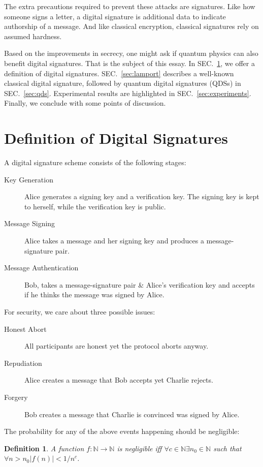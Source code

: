 \documentclass[%
 reprint,
 amsmath,amssymb,
 aps,
 pra,
]{revtex4-1}
\newtheorem{definition}{Definition}[section]
\begin{document}
The extra precautions required to prevent these attacks are signatures. Like how someone signs a letter, a digital signature is additional data to indicate authorship of a message. And like classical encryption, classical signatures rely on assumed hardness.

Based on the improvements in secrecy, one might ask if quantum physics can also benefit digital signatures. That is the subject of this essay. In SEC.\ \ref{sec:def}, we offer a definition of digital signatures. SEC.\ \ref{sec:lamport} describes a well-known classical digital signature, followed by quantum digital signatures (QDSs) in SEC.\ \ref{sec:qds}. Experimental results are highlighted in SEC.\ \ref{sec:experiments}. Finally, we conclude with some points of discussion.

\section{Definition of Digital Signatures}
\label{sec:def}

A digital signature scheme consists of the following stages:

\begin{description}
\item[Key Generation]Alice generates a signing key and a verification key. The signing key is kept to herself, while the verification key is public.
\item[Message Signing]Alice takes a message and her signing key and produces a message-signature pair.
\item[Message Authentication]Bob, takes a message-signature pair \& Alice's verification key and accepts if he thinks the message was signed by Alice.
\end{description}

For security, we care about three possible issues:

\begin{description}
\item[Honest Abort]All participants are honest yet the protocol aborts anyway.
\item[Repudiation]Alice creates a message that Bob accepts yet Charlie rejects.
\item[Forgery]Bob creates a message that Charlie is convinced was signed by Alice.
\end{description}

The probability for any of the above events happening should be negligible:

\begin{definition}
A function $f:\mathbb{N} \rightarrow \mathbb{N}$ is negligible iff $\forall c \in \mathbb{N} \exists n_0 \in \mathbb{N}$ such that $\forall n > n_0 |f(n)| < 1/n^c$.
\end{definition}
\end{document}
